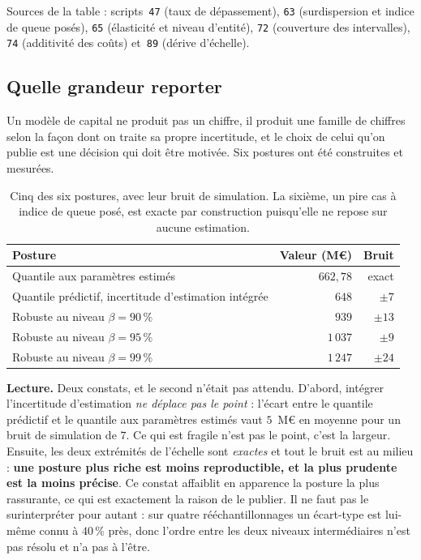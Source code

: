 \documentclass[12pt,a4paper]{article}
\theoremstyle{definition}
\begin{document}
\vspace{4pt}
\noindent Sources de la table : scripts~\texttt{47} (taux de dépassement),
\texttt{63} (surdispersion et indice de queue posés), \texttt{65} (élasticité et
niveau d'entité), \texttt{72} (couverture des intervalles), \texttt{74}
(additivité des coûts) et~\texttt{89} (dérive d'échelle).

\subsection{Quelle grandeur reporter}
\label{ss:posture}

Un modèle de capital ne produit pas un chiffre, il produit une famille de chiffres
selon la façon dont on traite sa propre incertitude, et le choix de celui qu'on
publie est une décision qui doit être motivée. Six postures ont été construites et
mesurées.

\begin{table}[htbp]
\centering\small
\renewcommand{\arraystretch}{1.2}
\begin{tabular}{@{}>{\raggedright\arraybackslash}p{6.8cm}rr@{}}
\toprule
\textbf{Posture} & \textbf{Valeur (M\euro)} & \textbf{Bruit} \\
\midrule
Quantile aux paramètres estimés & $662{,}78$ & exact \\
Quantile prédictif, incertitude d'estimation intégrée & $648$ & $\pm 7$ \\
Robuste au niveau $\beta = 90\,\%$ & $939$ & $\pm 13$ \\
Robuste au niveau $\beta = 95\,\%$ & $1\,037$ & $\pm 9$ \\
Robuste au niveau $\beta = 99\,\%$ & $1\,247$ & $\pm 24$ \\
\bottomrule
\end{tabular}
\caption{Cinq des six postures, avec leur bruit de simulation. La sixième, un
pire cas à indice de queue posé, est exacte par construction puisqu'elle ne repose
sur aucune estimation.}
\label{tab:postures}
\end{table}

\textbf{Lecture.} Deux constats, et le second n'était pas attendu. D'abord,
intégrer l'incertitude d'estimation \emph{ne déplace pas le point} : l'écart entre
le quantile prédictif et le quantile aux paramètres estimés vaut $5$~M\euro{} en
moyenne pour un bruit de simulation de $7$. Ce qui est fragile n'est pas le point,
c'est la largeur. Ensuite, les deux extrémités de l'échelle sont \emph{exactes} et
tout le bruit est au milieu : \textbf{une posture plus riche est moins
reproductible, et la plus prudente est la moins précise}. Ce constat affaiblit en
apparence la posture la plus rassurante, ce qui est exactement la raison de le
publier. Il ne faut pas le surinterpréter pour autant : sur quatre
rééchantillonnages un écart-type est lui-même connu à $40\,\%$ près, donc l'ordre
entre les deux niveaux intermédiaires n'est pas résolu et n'a pas à l'être.
\end{document}
